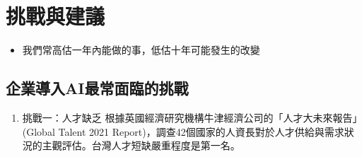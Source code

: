 \documentclass[a4paper,12pt]{article}
\begin{document}
\section{挑戰與建議}
\label{sec:org737680c}
\begin{itemize}
\item 我們常高估一年內能做的事，低估十年可能發生的改變\\
\end{itemize}
\subsection{企業導入AI最常面臨的挑戰}
\label{sec:orgb62b38b}
\begin{enumerate}
\item 挑戰一：人才缺乏
\label{sec:org5e35ddc}
根據英國經濟研究機構牛津經濟公司的「人才大未來報告」(Global Talent 2021 Report)，調查42個國家的人資長對於人才供給與需求狀況的主觀評估。台灣人才短缺嚴重程度是第一名。\\


\end{enumerate}
\end{document}
